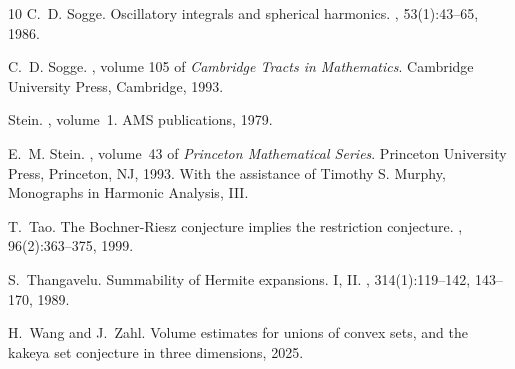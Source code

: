 \documentclass[12pt]{amsart}
\begin{document}
\begin{thebibliography}{10}
	C.~D. Sogge.
	\newblock Oscillatory integrals and spherical harmonics.
	, 53(1):43--65, 1986.
	
	C.~D. Sogge.
	, volume 105 of {\em
		Cambridge Tracts in Mathematics}.
	\newblock Cambridge University Press, Cambridge, 1993.
	
	Stein.
	, volume~1.
	\newblock AMS publications, 1979.
	
	E.~M. Stein.
	, volume~43 of {\em Princeton Mathematical Series}.
	\newblock Princeton University Press, Princeton, NJ, 1993.
	\newblock With the assistance of Timothy S. Murphy, Monographs in Harmonic
	Analysis, III.
	
	T.~Tao.
	\newblock The {B}ochner-{R}iesz conjecture implies the restriction conjecture.
	, 96(2):363--375, 1999.
	
	S.~Thangavelu.
	\newblock Summability of {H}ermite expansions. {I}, {II}.
	, 314(1):119--142, 143--170, 1989.
	
	H.~Wang and J.~Zahl.
	\newblock Volume estimates for unions of convex sets, and the kakeya set
	conjecture in three dimensions, 2025.
		
	
\end{thebibliography}
\end{document}
